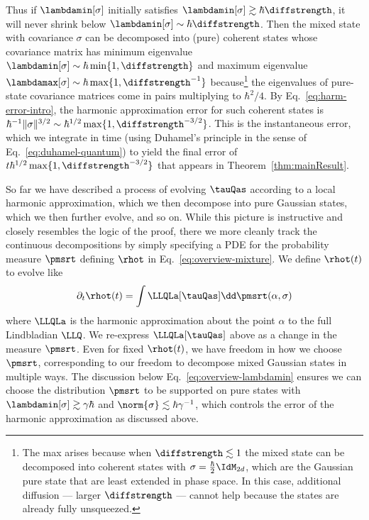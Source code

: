 \documentclass{article}
\numberwithin{equation}{section}
\begin{document}
Thus if $\lambdamin[\sigma]$ initially satisfies $\lambdamin[\sigma] \gtrsim \hbar\diffstrength$, it will never shrink below $\lambdamin[\sigma] \sim \hbar\diffstrength$.  Then the mixed state with covariance $\sigma$
can be decomposed into (pure) coherent states whose covariance matrix has minimum eigenvalue $\lambdamin[\sigma]\sim \hbar\min\{1,\diffstrength\}$ and
maximum eigenvalue $\lambdamax[\sigma]\sim\hbar\max\{1,\diffstrength^{-1}\}$ because\footnote{The max arises because when $\diffstrength \lesssim 1$ the mixed state can be decomposed into coherent states with $\sigma = \frac{\hbar}{2}\IdM_{2d}$, which are the Gaussian pure state that are least extended in phase space. In this case, additional diffusion --- larger $\diffstrength$ --- cannot help because the states are already fully unsqueezed.} the eigenvalues of pure-state covariance matrices come in pairs multiplying to $\hbar^2/4$. 
By Eq.~\eqref{eq:harm-error-intro}, the harmonic approximation error for such 
coherent states is $\hbar^{-1} \|\sigma\|^{3/2} \sim \hbar^{1/2} \max\{1,\diffstrength^{-3/2}\}$.  
This 
is the instantaneous error, which we integrate in time (using Duhamel's principle in the sense of Eq.~\eqref{eq:duhamel-quantum}) to yield the final 
error of $t\hbar^{1/2}\max\{1,\diffstrength^{-3/2}\}$ that appears in Theorem~\ref{thm:mainResult}. 

So far we have described a process of evolving $\tauQas$ according to a local harmonic approximation, which we then decompose into pure Gaussian states, which we then further evolve, and so on. While this picture is instructive and closely resembles the logic of the proof, there we more cleanly track the continuous decompositions by simply specifying a PDE for the probability measure $\pmsrt$ 
defining $\rhot$ in Eq.~\eqref{eq:overview-mixture}.  We define $\rhot(t)$ to evolve like
\begin{equation} 
\partial_t \rhot(t) = 
\int \LLQLa[\tauQas]\dd\pmsrt(\alpha,\sigma)
\end{equation}
where $\LLQLa$ is the harmonic approximation about the point $\alpha$ to the full Lindbladian $\LLQ$.  We re-express $\LLQLa[\tauQas]$ above as a change in the measure $\pmsrt$. Even for fixed $\rhot(t)$, we have freedom in how we choose $\pmsrt$, corresponding to our freedom to decompose mixed Gaussian states in multiple ways. The discussion below Eq.~\eqref{eq:overview-lambdamin} ensures we can choose the distribution $\pmsrt$ to be supported on pure states with $\lambdamin[\sigma] \gtrsim \gamma \hbar$ and $\norm{\sigma} \lesssim \hbar \gamma^{-1}$, which controls the error of the harmonic approximation as discussed above.
\end{document}
